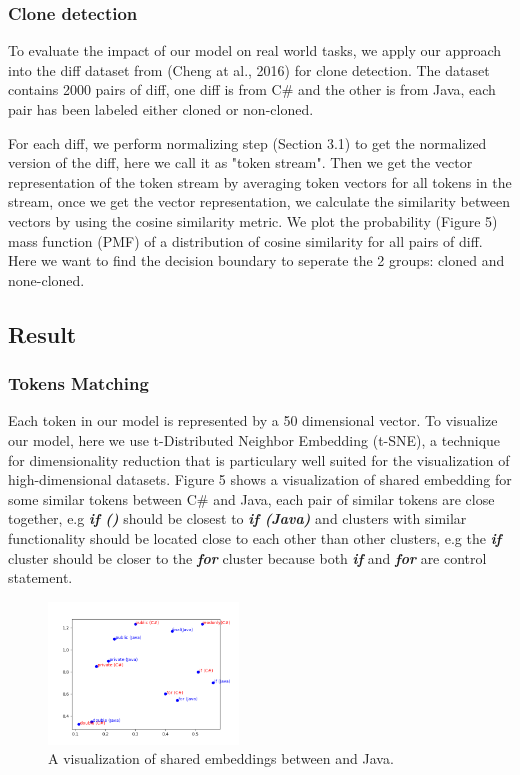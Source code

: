 \subsubsection{Clone detection}
To evaluate the impact of our model on real world tasks, we apply our approach into the diff dataset from (Cheng at al., 2016)\cite{cheng2017clcminer} for clone detection. The dataset contains 2000 pairs of diff, one diff is from C\# and the other is from Java, each pair has been labeled either cloned or non-cloned. 

For each diff, we perform normalizing step (Section 3.1) to get the normalized version of the diff, here we call it as "token stream". Then we get the vector representation of the token stream by averaging token vectors for all tokens in the stream, once we get the vector representation, we calculate the similarity between vectors by using the cosine similarity metric. We plot the probability (Figure 5) mass function (PMF) of a distribution of cosine similarity for all pairs of diff. Here we want to find the decision boundary to seperate the 2 groups: cloned and none-cloned. 

\subsection{Result}
\subsubsection{Tokens Matching}
Each token in our model is represented by a 50 dimensional vector. To visualize our model, here we use t-Distributed Neighbor Embedding (t-SNE)\cite{maaten2008visualizing}, a technique for dimensionality reduction that is particulary well suited for the visualization of high-dimensional datasets. Figure 5 shows a visualization of shared embedding for some similar tokens between C\# and Java, each pair of similar tokens are close together, e.g \textit{\textbf{if ()}} should be closest to \textit{\textbf{if (Java)}} and clusters with similar functionality should be located close to each other than other clusters, e.g the \textit{\textbf{if}} cluster should be closer to the \textit{\textbf{for}} cluster because both \textit{\textbf{if}} and \textit{\textbf{for}} are control statement.

\begin{figure}[t!]
	\includegraphics[width=0.45\textwidth]{example_bi2vec_tsne}
	\caption{A visualization of shared embeddings between  and Java.}
	\label{fig:clf}
\end{figure}

